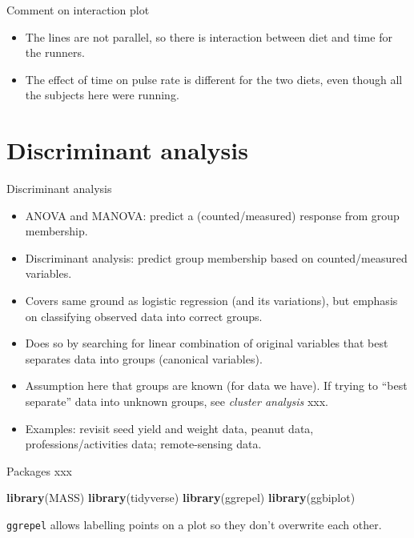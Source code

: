 \documentclass[ignorenonframetext,]{beamer}
\newenvironment{Shaded}{\begin{snugshade}}{\end{snugshade}}
\newcommand{\KeywordTok}[1]{\textcolor[rgb]{0.13,0.29,0.53}{\textbf{#1}}}
\newcommand{\NormalTok}[1]{#1}
\providecommand{\tightlist}{%
  \setlength{\itemsep}{0pt}\setlength{\parskip}{0pt}}
\begin{document}
\begin{frame}{Comment on interaction plot}
\protect\hypertarget{comment-on-interaction-plot}{}

\begin{itemize}
\tightlist
\item
  The lines are not parallel, so there is interaction between diet and
  time for the runners.
\item
  The effect of time on pulse rate is different for the two diets, even
  though all the subjects here were running.
\end{itemize}

\end{frame}

\hypertarget{discriminant-analysis}{%
\section{Discriminant analysis}\label{discriminant-analysis}}

\begin{frame}{Discriminant analysis}
\protect\hypertarget{discriminant-analysis-1}{}

\begin{itemize}
\item
  ANOVA and MANOVA: predict a (counted/measured) response from group
  membership.
\item
  Discriminant analysis: predict group membership based on
  counted/measured variables.
\item
  Covers same ground as logistic regression (and its variations), but
  emphasis on classifying observed data into correct groups.
\item
  Does so by searching for linear combination of original variables that
  best separates data into groups (canonical variables).
\item
  Assumption here that groups are known (for data we have). If trying to
  ``best separate'' data into unknown groups, see \emph{cluster
  analysis} xxx.
\item
  Examples: revisit seed yield and weight data, peanut data,
  professions/activities data; remote-sensing data.
\end{itemize}

\end{frame}

\begin{frame}[fragile]{Packages xxx}
\protect\hypertarget{packages-xxx}{}

\begin{Shaded}
\begin{Highlighting}[]
\KeywordTok{library}\NormalTok{(MASS)}
\KeywordTok{library}\NormalTok{(tidyverse)}
\KeywordTok{library}\NormalTok{(ggrepel)}
\KeywordTok{library}\NormalTok{(ggbiplot)}
\end{Highlighting}
\end{Shaded}

\texttt{ggrepel} allows labelling points on a plot so they don't
overwrite each other.

\end{frame}
\end{document}
